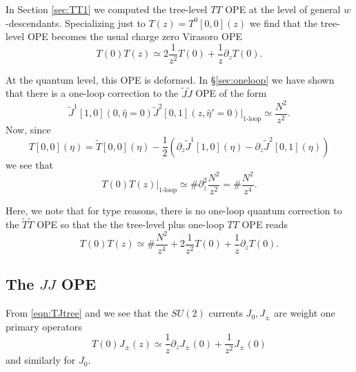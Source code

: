 \documentclass[11pt]{amsart}
\newcommand{\del}{\partial}
\newcommand{\what}{\widehat}
\newcommand{\til}{\widetilde}
\theoremstyle{thm}
\numberwithin{equation}{subsection}
\theoremstyle{def}
\theoremstyle{rem}
\begin{document}
In Section \ref{sec:TT1} we computed the tree-level $TT$ OPE at the level of general $w$-descendants.
Specializing just to $T (z) = T^0[0,0](z)$ we find that the tree-level OPE becomes the usual charge zero Virasoro OPE
\[
T(0) T(z) \simeq 2 \frac{1}{z^2} T(0) + \frac{1}{z} \partial_z T(0) .
\]

At the quantum level, this OPE is deformed. 
In \S \ref{sec:oneloop} we have shown that there is a one-loop correction to the $\til J \til J$ OPE of the form 
\[
\til J^{1}[1,0] (0, \what\eta = 0) \til J^{2} [0,1] (z, \what\eta'=0) |_{\text{1-loop}} \simeq \frac{N^2}{z^2} .
\]
Now, since 
\[
T[0,0] (\eta) = \til T[0,0] (\eta) - \frac12 \left(\del_z \til J^{1}[1,0] (\eta) - \del_z \til J^{2}[0,1] (\eta) \right) 
\]
we see that 
\[
T(0) T(z)|_{\text{1-loop}} \simeq \# \del_z^2 \frac{N^2}{z^2} = \# \frac{N^2}{z^4} .
\]

Here, we note that for type reasons, there is no one-loop quantum correction to the $\til T \til T$ OPE so that the the tree-level plus one-loop $TT$ OPE reads
\[
T(0) T(z) \simeq \# \frac{N^2}{z^4} + 2 \frac{1}{z^2} T(0) + \frac{1}{z} \partial_z T(0) .
\]


\subsection{The $JJ$ OPE } 

From \eqref{eqn:TJtree} and we see that the $SU(2)$ currents $J_0, J_\pm$ are weight one primary operators
\[
T(0) J_\pm (z) \simeq \frac1z \partial_z J_\pm (0) + \frac{1}{z^2} J_\pm (0) 
\]
and similarly for $J_0$. 
\end{document}
